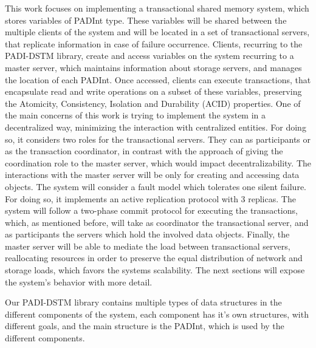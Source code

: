 \documentclass[times, 10pt,twocolumn]{article}
\begin{document}
This work focuses on implementing a transactional shared memory system, which stores variables of PADInt type. These variables will be shared between the multiple clients of the system and will be located in a set of transactional servers, that replicate information in case of failure occurrence. Clients, recurring to the PADI-DSTM library, create and access variables on the system recurring to a master server, which maintains information about storage servers, and manages the location of each PADInt. Once accessed, clients can execute transactions, that encapsulate read and write operations on a subset of these variables, preserving the Atomicity, Consistency, Isolation and Durability (ACID) properties. One of the main concerns of this work is trying to implement the system in a decentralized way, minimizing the interaction with centralized entities. For doing so, it considers two roles for the transactional servers. They can as participants or as the transaction coordinator, in contrast with the approach of giving the coordination role to the master server, which would impact decentralizability. The interactions with the master server will be only for creating and accessing data objects. The system will consider a fault model which tolerates one silent failure. For doing so, it implements an active replication protocol with 3 replicas. The system will follow a two-phase commit protocol for executing the transactions, which, as mentioned before, will take as coordinator the transactional server, and as participants the servers which hold the involved data objects. Finally, the master server will be able to mediate the load between transactional servers, reallocating resources in order to preserve the equal distribution of network and storage loads, which favors the systems scalability. The next sections will expose the system's behavior with more detail.




Our PADI-DSTM library contains multiple types of data structures in the different components of the system, each component has it's own structures, with different goals, and the main structure is the PADInt, which is used by the different components.
\end{document}
